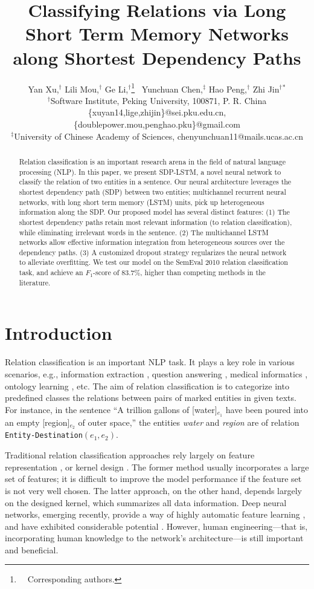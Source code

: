 \documentclass[11pt,a4paper]{article}
\title{Classifying Relations via Long Short Term Memory Networks\\
along Shortest Dependency Paths}
\date{}
\author{Yan Xu,$\!\!^\dag$ Lili Mou,$\!\!^\dag$ Ge Li,$\!^\dag$\thanks{\ \ Corresponding authors.}
\ Yunchuan Chen,$\!\!^\ddagger$ Hao Peng,$\!\!^\dag$ Zhi Jin$^{\dag}{}^*$\\
$^\dag$Software Institute, Peking University, 100871, P. R. China\\
\{xuyan14,lige,zhijin\}@sei.pku.edu.cn,\{doublepower.mou,penghao.pku\}@gmail.com\\
$^\ddagger$University of Chinese Academy of Sciences, chenyunchuan11@mails.ucas.ac.cn
}
\date{}
\begin{document}
\maketitle


\begin{abstract}
Relation classification is an important research arena in
the field of natural language processing (NLP).
In this paper, we present SDP-LSTM, a novel neural network to classify the relation
of two entities in a sentence.
Our neural architecture leverages the shortest dependency path (SDP) between two entities;
multichannel recurrent neural networks, with long short term memory (LSTM) units,
pick up heterogeneous information along the SDP.
Our proposed model has several distinct features: (1)
The shortest dependency paths retain
most relevant information (to relation classification),
while eliminating irrelevant words in the sentence. (2)
The multichannel LSTM networks allow
effective information integration from heterogeneous sources over the dependency paths.
(3) A customized dropout strategy regularizes the neural network to alleviate overfitting.
We test our model on the SemEval 2010 relation classification task,
and achieve an $F_1$-score of 83.7\%, higher than competing methods in the literature.


\end{abstract}

\section{Introduction}\label{sIntroduction}


Relation classification is an important NLP task.
It plays a key role in various scenarios,
e.g., information extraction \cite{openIE}, question answering \cite{QAFreebase},
medical informatics \cite{MedicalRE}, ontology learning \cite{ontology}, etc.
The aim of relation classification is to categorize into predefined classes the relations between pairs of marked entities in given texts.
For instance, in the sentence ``A trillion gallons of
[water]$_{e_1}$ have been poured into an empty [region]$_{e_2}$ of outer space,'' the entities \textit{water} and
\textit{region} are of relation \verb|Entity-Destination|$({e_1}, {e_2})$.

Traditional relation classification approaches rely largely on feature representation
\cite{MaxEntRE}, or kernel design \cite{KerRE,SpdKernel}.
The former method usually incorporates a large set of features;
it is difficult to improve the model performance
if the feature set is not very well chosen.
The latter approach, on the other hand,
depends largely on the designed kernel, which
summarizes all data information.
Deep neural networks, emerging recently,
provide a way of highly automatic feature learning \cite{RL},
and have exhibited considerable potential \cite{CNN,RankCNN}.
However, human engineering---that is, incorporating human knowledge to the network's architecture---is still
important and beneficial.
\end{document}

